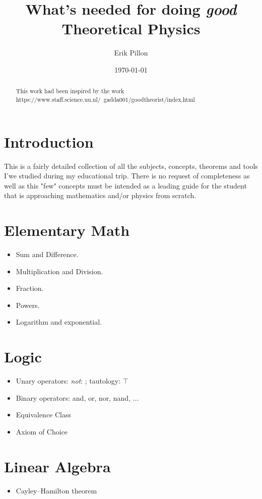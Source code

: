 \documentclass[10pt]{article}
\author{Erik Pillon}
\date{\today}
\title{What's needed for doing \emph{good} Theoretical Physics}
\begin{document}
\maketitle
\begin{abstract}
This work had been inspired by the work https://www.staff.science.uu.nl/~gadda001/goodtheorist/index.html
\end{abstract}
\section*{Introduction}
This is a fairly detailed collection of all the subjects, concepts, theorems and tools I'we studied during my educational trip. There is no request of completeness as well as this "few" concepts must be intended as a leading guide for the student that is approaching mathematics and/or physics from scratch.
\section{Elementary Math}
\begin{itemize}
	\item Sum and Difference.
	\item Multiplication and Division.
	\item Fraction.
	\item Powers.
	\item Logarithm and exponential.
\end{itemize}

\section{Logic}
\begin{itemize}
	\item Unary operators: \emph{not}: \textlnot  ; tautology: $ \top $	 
	\item Binary operators: and, or, nor, nand, ...
	\item Equivalence Class
	\item Axiom of Choice
\end{itemize}

\section{Linear Algebra}
\begin{itemize}
	\item Cayley–Hamilton theorem
\end{itemize}
\end{document}
